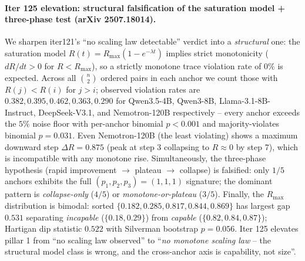 \documentclass{article}
\begin{document}
\paragraph{Iter 125 elevation: structural falsification of the saturation model + three-phase test (arXiv 2507.18014).}
\label{par:scaling-iter125}
We sharpen iter121's ``no scaling law detectable'' verdict into a
\emph{structural} one: the saturation model
$R(t) = R_{\max}(1 - e^{-\lambda t})$ implies strict monotonicity
($dR/dt > 0$ for $R < R_{\max}$), so a strictly monotone trace
violation rate of $0\%$ is expected.  Across all $\binom{n}{2}$
ordered pairs in each anchor we count those with $R(j) < R(i)$
for $j > i$; observed violation rates are $0.382, 0.395, 0.462,
0.363, 0.290$ for Qwen3.5-4B, Qwen3-8B, Llama-3.1-8B-Instruct,
DeepSeek-V3.1, and Nemotron-120B respectively -- every anchor
exceeds the $5\%$ noise floor with per-anchor binomial $p < 0.001$
and majority-violates binomial $p = 0.031$.  Even Nemotron-120B
(the least violating) shows a maximum downward step
$\Delta R = 0.875$ (peak at step 3 collapsing to $R \approx 0$
by step 7), which is incompatible with any monotone rise.
Simultaneously, the three-phase hypothesis
\citep{arXiv2507.18014} (rapid improvement $\to$ plateau $\to$
collapse) is falsified: only $1/5$ anchors exhibits the full
$(p_1, p_2, p_3) = (1, 1, 1)$ signature; the dominant pattern is
\emph{collapse-only} ($4/5$) or \emph{monotone-or-plateau}
($3/5$).  Finally, the $R_{\max}$ distribution is bimodal:
sorted $\{0.182, 0.285, 0.817, 0.844, 0.869\}$ has largest gap
$0.531$ separating \emph{incapable} ($\{0.18, 0.29\}$) from
\emph{capable} ($\{0.82, 0.84, 0.87\}$); Hartigan dip statistic
$0.522$ with Silverman bootstrap $p = 0.056$.  Iter 125
elevates pillar 1 from ``no scaling law observed'' to ``\emph{no
monotone scaling law} -- the structural model class is wrong,
and the cross-anchor axis is capability, not size''.
\end{document}

